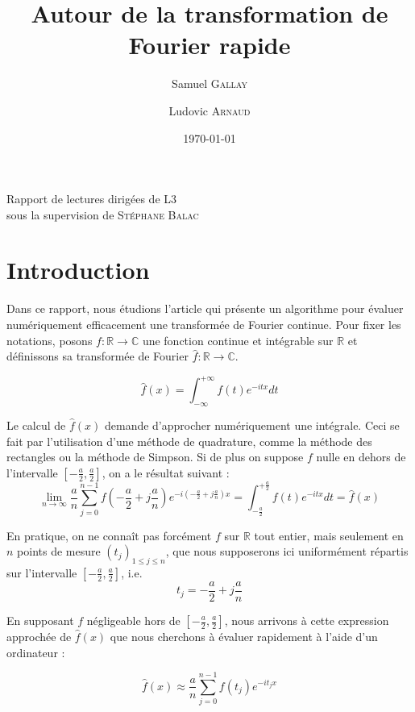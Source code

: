 \documentclass{article}
\title{Autour de la transformation de Fourier rapide}
\author[1]{Samuel \textsc{Gallay}}
\author[2]{Ludovic \textsc{Arnaud}}
\affil[1]{\url{samuel.gallay@ens-rennes.fr}}
\affil[2]{\url{ludovic.arnaud@ens-rennes.fr}}
\date{\today}
\begin{document}
\maketitle

\begin{center}
Rapport de lectures dirigées de L3\\
sous la supervision de \textsc{Stéphane Balac}
\end{center}

\tableofcontents

\clearpage
\section{Introduction}

Dans ce rapport, nous étudions l'article \cite{FOURINT} qui présente un algorithme pour évaluer numériquement efficacement une transformée de Fourier continue. 
Pour fixer les notations, posons $f: \mathbb{R} \rightarrow \mathbb{C}$ une fonction continue et intégrable sur $\mathbb{R}$ et définissons sa transformée de Fourier $\hat{f}: \mathbb{R} \rightarrow \mathbb{C}$.

$$ \hat{f}(x) = \int_{-\infty}^{+\infty} f(t)e^{-itx}dt $$

Le calcul de $\hat{f}(x)$ demande d'approcher numériquement une intégrale.
Ceci se fait par l'utilisation d'une méthode de quadrature, comme la méthode des rectangles ou la méthode de Simpson. 
Si de plus on suppose $f$ nulle en dehors de l'intervalle $[-\frac{a}{2} ,\frac{a}{2} ]$, on a le résultat suivant : 
$$  \lim_{n\to\infty}\frac{a}{n}\sum_{j=0}^{n-1}f(-\frac{a}{2} + j \frac{a}{n} )e^{-i (-\frac{a}{2} + j \frac{a}{n} )x} = \int_{-\frac{a}{2}}^{+\frac{a}{2}} f(t)e^{-itx}dt = \hat{f}(x)$$

En pratique, on ne connaît pas forcément $f$ sur $\mathbb{R}$ tout entier, mais seulement en $n$ points de mesure $(t_j)_{1 \le j \le n}$, que nous supposerons ici uniformément répartis sur l'intervalle $[-\frac{a}{2}, \frac{a}{2} ]$, i.e. 
$$t_j = -\frac{a}{2} + j \frac{a}{n} $$

En supposant $f$ négligeable hors de $[-\frac{a}{2}, \frac{a}{2} ]$, nous arrivons à cette expression approchée de $\hat{f}(x)$ que nous cherchons à évaluer rapidement à l'aide d'un ordinateur : 

\begin{equation}
\label{label1}
\hat{f}(x) \approx \frac{a}{n}\sum_{j=0}^{n-1}f(t_j)e^{-i t_j x}
\end{equation}
\end{document}
